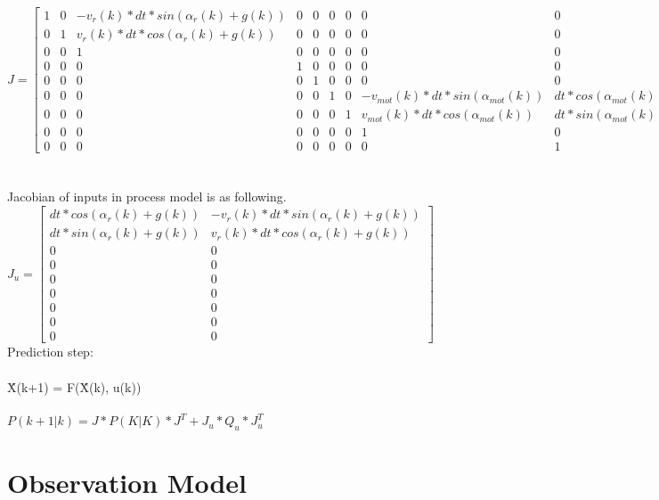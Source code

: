 \documentclass[11pt,a4paper]{article}
\begin{document}
\noindent $J=\begin{bmatrix}    1  &  0  &   -v_{r}(k)*dt*sin(\alpha_{r}(k) + g(k)) & 0 & 0 & 0 & 0 & 0 & 0 \\
						0  &  1  &   v_{r}(k)*dt*cos(\alpha_{r}(k) + g(k)) & 0 & 0 & 0 & 0 & 0 & 0 \\
						0  &  0  &   1   &  0 & 0 & 0 & 0 & 0 & 0 \\
						0  &  0  &   0   &  1 & 0 & 0 & 0 & 0 & 0 \\
						0  &  0  &   0   &  0 & 1 & 0 & 0 & 0 & 0 \\
						0  &  0  &   0   &  0 & 0 & 1 & 0 & -v_{mot}(k)*dt*sin(\alpha_{mot}(k)) &  dt*cos(\alpha_{mot}(k)) \\
						0  &  0  &   0   &  0 & 0 & 0 & 1 &  v_{mot}(k)*dt*cos(\alpha_{mot}(k)) & dt*sin(\alpha_{mot}(k)) \\
						0  &  0  &   0   &  0 & 0 & 0 & 0 & 1 & 0 \\
						0  &  0  &   0   &  0 & 0 & 0 & 0 & 0 & 1 
\end{bmatrix}$
\\
\\
\\
Jacobian of inputs in process model is as following.
\\


\noindent $J_{u}=\begin{bmatrix}   dt*cos(\alpha_{r}(k) + g(k)) & -v_{r}(k)*dt*sin(\alpha_{r}(k) + g(k))  \\
						           dt*sin(\alpha_{r}(k) + g(k)) &  v_{r}(k)*dt*cos(\alpha_{r}(k) + g(k)) \\
						0  &  0   \\
						0  &  0  \\
						0  &  0  \\
						0  &  0  \\
						0  &  0  \\
						0  &  0  \\
						0  &  0   
\end{bmatrix} $
\\

\noindent Prediction step:
\\
\\
\^{X(k+1)} = F(\^{X(k)}, u(k))
\\
\\
\noindent $P(k+1|k) = J*P(K|K)*J^{T} + J_{u}*Q_{u}*J_{u}^{T}$

   
\section{Observation Model}
\end{document}
